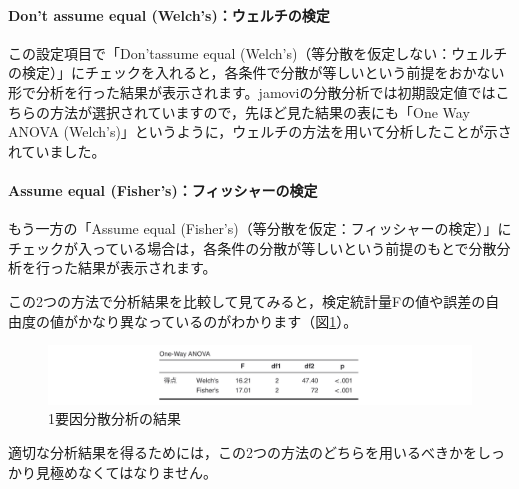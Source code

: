 \documentclass[
  12pt,
  a5jpaper,
  lualatex, ja=standard]{bxjsbook}
\begin{document}
\hypertarget{dont-assume-equal-welchsux30a6ux30a7ux30ebux30c1ux306eux691cux5b9a}{%
\paragraph*{Don't assume equal (Welch's)：ウェルチの検定}\label{dont-assume-equal-welchsux30a6ux30a7ux30ebux30c1ux306eux691cux5b9a}}

この設定項目で「Don'tassume equal (Welch's)（等分散を仮定しない：ウェルチの検定）」にチェックを入れると，各条件で分散が等しいという前提をおかない形で分析を行った結果が表示されます。jamoviの分散分析では初期設定値ではこちらの方法が選択されていますので，先ほど見た結果の表にも「One Way ANOVA (Welch's)」というように，ウェルチの方法を用いて分析したことが示されていました。

\hypertarget{assume-equal-fishersux30d5ux30a3ux30c3ux30b7ux30e3ux30fcux306eux691cux5b9a}{%
\paragraph*{Assume equal (Fisher's)：フィッシャーの検定}\label{assume-equal-fishersux30d5ux30a3ux30c3ux30b7ux30e3ux30fcux306eux691cux5b9a}}

もう一方の「Assume equal (Fisher's)（等分散を仮定：フィッシャーの検定）」にチェックが入っている場合は，各条件の分散が等しいという前提のもとで分散分析を行った結果が表示されます。

この2つの方法で分析結果を比較して見てみると，検定統計量Fの値や誤差の自由度の値がかなり異なっているのがわかります（図\ref{fig:ANOVA-oneway-fisher-results}）。

\begin{figure}[!ht]

{\centering \includegraphics[width=1\linewidth]{images/ANOVA/oneway-fisher-results} 

}

\caption{1要因分散分析の結果}\label{fig:ANOVA-oneway-fisher-results}
\end{figure}

適切な分析結果を得るためには，この2つの方法のどちらを用いるべきかをしっかり見極めなくてはなりません。
\end{document}
